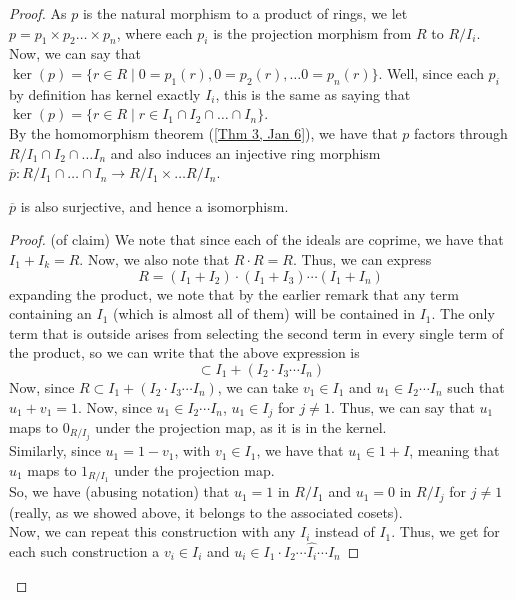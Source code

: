\begin{proof}
    As $p$ is the natural morphism to a product of rings, we let $p = p_1 \times p_2 \dots \times p_n$,
    where each $p_i$ is the projection morphism from $R$ to $R / I_i$. Now, we can say that
    $\ker(p) = \{r \in R \mid 0 = p_1(r), 0 = p_2(r), \dots 0 = p_n(r) \}$. Well, since each $p_i$ by definition has
    kernel exactly $I_i$, this is the same as saying that
    $\ker(p) = \{r \in R \mid r \in I_1 \cap I_2 \cap \dots \cap I_n \}$. \\
    By the homomorphism theorem (\ref{Thm 3, Jan 6}), we have that $p$ factors through
    $R / I_1 \cap I_2 \cap \dots I_n$ and also induces an injective ring morphism
    $\overline{p}: R/ I_1 \cap \dots \cap I_n \rightarrow R/I_1 \times \dots R/I_n$.
    \begin{claim}
        $\overline{p}$ is also surjective, and hence a isomorphism.
    \end{claim}
    \begin{proof} (of claim)
        We note that since each of the ideals are coprime, we have that $I_1 + I_k = R$.
        Now, we also note that $R \cdot R = R$. Thus, we can express
        $$
        R = (I_1  + I_2) \cdot (I_1 + I_3) \cdots (I_1 + I_n)
        $$
        expanding the product, we note that by the earlier remark that any term
        containing an $I_1$ (which is almost all of them) will be contained in
        $I_1$. The only term that is outside arises from selecting the second term
        in every single term of the product, so we can write that the above expression
        is
        $$
        \subset I_1 + (I_2 \cdot I_3 \cdots I_n)
        $$
        Now, since $R \subset I_1 + (I_2 \cdot I_3 \cdots I_n)$, we can take
        $v_1 \in I_1$ and $u_1 \in I_2 \cdots I_n$ such that $u_1 + v_1 = 1$.
        Now, since $u_1 \in I_2 \cdots I_n$, $u_1 \in I_j$ for $j \neq 1$. Thus,
        we can say that $u_1$ maps to $0_{R/I_j}$ under the projection map, as it is
        in the kernel. \\
        Similarly, since $u_1 = 1 - v_1$, with $v_1 \in I_1$, we have that $u_1 \in 1 + I$,
        meaning that $u_1$ maps to $1_{R/I_1}$ under the projection map. \\
        So, we have (abusing notation) that $u_1 = 1$ in $R/I_1$ and $u_1 = 0$ in $R/I_j$ for $j \neq 1$
        (really, as we showed above, it belongs to the associated cosets). \\
        Now, we can repeat this construction with any $I_i$ instead of $I_1$.
        Thus, we get for each such construction a $v_i \in I_i$ and $u_i \in I_1 \cdot I_2 \cdots \widehat{I_i} \cdots I_n$

\end{proof}
\end{proof}
